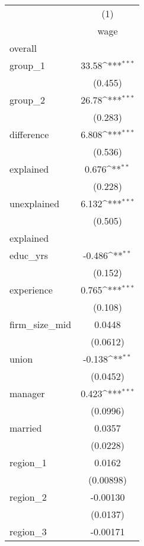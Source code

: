 {
\def\sym#1{\ifmmode^{#1}\else\(^{#1}\)\fi}
\begin{tabular}{l*{1}{c}}
\hline\hline
            &\multicolumn{1}{c}{(1)}\\
            &\multicolumn{1}{c}{wage}\\
\hline
overall     &                     \\
group\_1     &       33.58\sym{***}\\
            &     (0.455)         \\
[1em]
group\_2     &       26.78\sym{***}\\
            &     (0.283)         \\
[1em]
difference  &       6.808\sym{***}\\
            &     (0.536)         \\
[1em]
explained   &       0.676\sym{**} \\
            &     (0.228)         \\
[1em]
unexplained &       6.132\sym{***}\\
            &     (0.505)         \\
\hline
explained   &                     \\
educ\_yrs    &      -0.486\sym{**} \\
            &     (0.152)         \\
[1em]
experience  &       0.765\sym{***}\\
            &     (0.108)         \\
[1em]
firm\_size\_mid&      0.0448         \\
            &    (0.0612)         \\
[1em]
union       &      -0.138\sym{**} \\
            &    (0.0452)         \\
[1em]
manager     &       0.423\sym{***}\\
            &    (0.0996)         \\
[1em]
married     &      0.0357         \\
            &    (0.0228)         \\
[1em]
region\_1    &      0.0162         \\
            &   (0.00898)         \\
[1em]
region\_2    &    -0.00130         \\
            &    (0.0137)         \\
[1em]
region\_3    &    -0.00171         \\

\end{tabular}}
